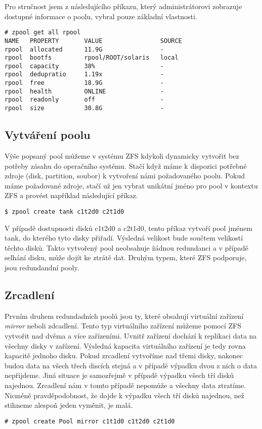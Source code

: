 Pro stručnost jsem z následujícího příkazu, který administrátorovi zobrazuje dostupné informace o poolu, vybral pouze základní vlastnosti.
\begin{verbatim}
# zpool get all rpool
NAME   PROPERTY       VALUE                SOURCE
rpool  allocated      11.9G                -
rpool  bootfs         rpool/ROOT/solaris   local
rpool  capacity       38%                  -
rpool  dedupratio     1.19x                -
rpool  free           18.9G                -
rpool  health         ONLINE               -
rpool  readonly       off                  -
rpool  size           30.8G                -
\end{verbatim}

\subsection{Vytváření poolu}
Výše popsaný pool můžeme v systému ZFS kdykoli dynamicky vytvořit bez potřeby zásahu do operačního systému. Stačí když máme k dispozici potřebné zdroje (disk, partition, soubor) k vytvoření námi požadovaného poolu. Pokud máme požadované zdroje, stačí už jen vybrat unikátní jméno pro pool v kontextu ZFS a provést například následující příkaz.
\begin{verbatim}
$ zpool create tank c1t2d0 c2t1d0
\end{verbatim}
V případě dostupnosti disků c1t2d0 a c2t1d0, tento příkaz vytvoří pool jménem tank, do kterého tyto disky přiřadí. Výsledná velikost bude součtem velikostí těchto disků. Takto vytvořený pool neobsahuje žádnou redundanci a v případě selhání disku, může dojít ke ztrátě dat. Druhým typem, které ZFS podporuje, jsou redundandní pooly.
\subsection{Zrcadlení}
Prvním druhem redundadních poolů jsou ty, které obsahují virtuální zařízení \emph{mirror} neboli zdcadlení. Tento typ virtuálního zařízení můžeme pomocí ZFS vytvořit nad dvěma a více zařízeními. Uvnitř zařízení dochází k replikaci data na všechny disky v zařízení. Výsledná kapacita virtuálního zařízení je tedy rovna kapacitě jednoho disku. Pokud zrcadlení vytvoříme nad třemi disky, nakonec budou data na všech třech discích stejná a v případě výpadku dvou z nich o data nepřijdeme. Jiná situace je samozřejmě v případě výpadku všech tří disků najednou. Zrcadlení nám v tomto případě nepomůže a všechny data ztratíme. Nicméně pravděpodobnost, že dojde k výpadku všech tří disků najednou, než stihneme alespoň jeden vyměnit, je malá.
\begin{verbatim}
# zpool create Pool mirror c1t1d0 c1t2d0 c2t1d0
\end{verbatim}

